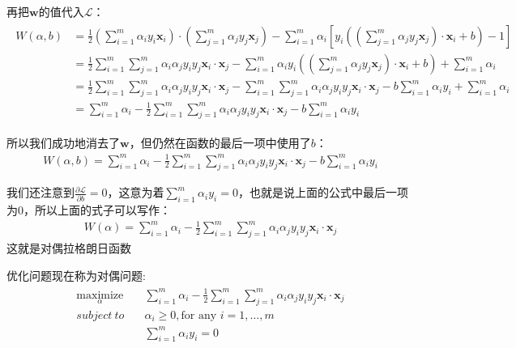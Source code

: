 再把$\mathbf{w}$的值代入$\mathcal{L}$：
\begin{gather*}
\begin{align*}
W(\alpha,b) &=\frac{1}{2}(\sum_{i=1}^m \alpha_i y_i \mathbf{x}_i) \cdot (\sum_{j=1}^m \alpha_j y_j \mathbf{x}_j) - \sum_{i=1}^m \alpha_i[y_i ((\sum_{j=1}^m \alpha_j y_j \mathbf{x}_j)\cdot \mathbf{x}_i+b)-1] \\
&= \frac{1}{2}\sum_{i=1}^m\sum_{j=1}^m \alpha_i \alpha_j y_i y_j \mathbf{x}_i \cdot \mathbf{x}_j - \sum_{i=1}^m\alpha_i y_i ((\sum_{j=1}^m \alpha_j y_j \mathbf{x}_j)\cdot \mathbf{x}_i+b) + \sum_{i=1}^m \alpha_i \\
&= \frac{1}{2}\sum_{i=1}^m\sum_{j=1}^m \alpha_i \alpha_j y_i y_j \mathbf{x}_i \cdot \mathbf{x}_j -\sum_{i=1}^m\sum_{j=1}^m \alpha_i \alpha_j y_i y_j \mathbf{x}_i \cdot \mathbf{x}_j - b\sum_{i=1}^m \alpha_i y_i + \sum_{i=1}^m \alpha_i \\
&= \sum_{i=1}^m \alpha_i - \frac{1}{2}\sum_{i=1}^m\sum_{j=1}^m \alpha_i \alpha_j y_i y_j \mathbf{x}_i \cdot \mathbf{x}_j  - b\sum_{i=1}^m \alpha_i y_i
\end{align*}
\end{gather*}

所以我们成功地消去了$\mathbf{w}$，但仍然在函数的最后一项中使用了$b$：
\begin{gather*}
W(\alpha,b) = \sum_{i=1}^m \alpha_i - \frac{1}{2}\sum_{i=1}^m\sum_{j=1}^m \alpha_i \alpha_j y_i y_j \mathbf{x}_i \cdot \mathbf{x}_j  - b\sum_{i=1}^m \alpha_i y_i
\end{gather*}

我们还注意到$\frac{\partial \mathcal{L}}{\partial b}= 0$，这意为着$\sum\limits_{i=1}^m\alpha_i y_i = 0$，也就是说上面的公式中最后一项为0，所以上面的式子可以写作：
\begin{gather*}
W(\alpha) = \sum_{i=1}^m \alpha_i - \frac{1}{2}\sum_{i=1}^m\sum_{j=1}^m \alpha_i \alpha_j y_i y_j \mathbf{x}_i \cdot \mathbf{x}_j 
\end{gather*}
这就是对偶拉格朗日函数

优化问题现在称为对偶问题:
\begin{gather*}
\begin{align*}
\underset{\alpha}{\text{maximize}}\quad & \sum_{i=1}^m \alpha_i - \frac{1}{2}\sum_{i=1}^m\sum_{j=1}^m \alpha_i \alpha_j y_i y_j \mathbf{x}_i \cdot \mathbf{x}_j \\
subject\ to \quad& \alpha_i \geq 0,\text{for any }i=1,\dots,m \\
 &\sum_{i=1}^m\alpha_i y_i = 0
\end{align*}
\end{gather*}

